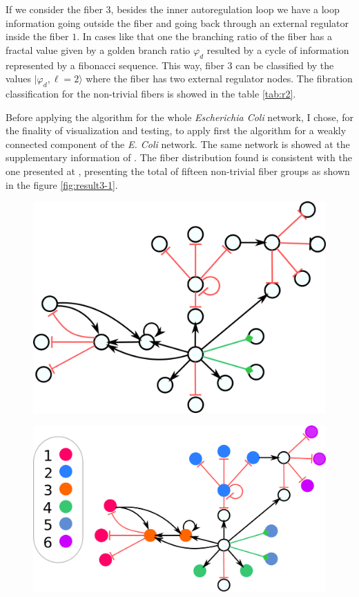 \documentclass[12pt]{diazessay} %
\begin{document}
If we consider the fiber $3$, besides the inner autoregulation loop we have a loop information going outside the fiber and going back through an external regulator inside the fiber $1$. In cases like that one the branching ratio of the fiber has a fractal value given by a golden branch ratio $\varphi_d$ resulted by a cycle of information represented by a fibonacci sequence. This way, fiber $3$ can be classified by the values $| \varphi_d, \ell = 2 \rangle$ where the fiber has two external regulator nodes. The fibration classification for the non-trivial fibers is showed in the table \ref{tab:r2}.

Before applying the algorithm for the whole \textit{Escherichia Coli} network, I chose, for the finality of visualization and testing, to apply first the algorithm for a weakly connected component of the \textit{E. Coli} network. The same network is showed at the supplementary information of \cite{fibration2019}. The fiber distribution found is consistent with the one presented at \cite{fibration2019}, presenting the total of fifteen non-trivial fiber groups as shown in the figure \ref{fig:result3-1}.

\begin{figure}[H]
	\centering
	\includegraphics[scale=0.275]{Figures/result2.png}
\end{figure}
\begin{figure}[H]
	\centering
	\includegraphics[scale=0.275]{Figures/result2-label.png}
\end{figure}
\end{document}
